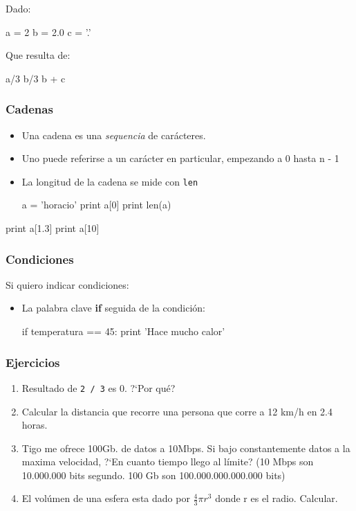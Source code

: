 \begin{frame}[fragile]
    Dado:
    \begin{python}
        a = 2
        b = 2.0
        c = '.'
    \end{python}
    Que resulta de:
    \begin{python}
        a/3
        b/3
        b + c
    \end{python}
\end{frame}

\begin{frame}[fragile]
    \frametitle{Cadenas}
    \begin{itemize}
        \item Una cadena es una \emph{sequencia} de car\'acteres.
        \item Uno puede referirse a un car\'acter en particular, empezando a 0 hasta n - 1
        \item La longitud de la cadena se mide con \texttt{len}
            \begin{python}
                a = 'horacio'
                print a[0]
                print len(a)
            \end{python}
    \end{itemize}
    \begin{python}
        print a[1.3]
        print a[10]
    \end{python}
\end{frame}


\begin{frame}[fragile]
    \frametitle{Condiciones}
    Si quiero indicar condiciones:
    \begin{itemize}
        \item La palabra clave \textbf{if} seguida de la condici\'on:
            \begin{python}
                if temperatura == 45:
                    print 'Hace mucho calor'
            \end{python}
    \end{itemize}
\end{frame}

\begin{frame}
    \frametitle{Ejercicios}
    \begin{enumerate}
        \item Resultado de \texttt{2 / 3} es 0. ?`Por qu\'e?
        \item Calcular la distancia que recorre una persona que corre a 12 km/h en 2.4 horas.
        \item Tigo me ofrece 100Gb. de datos a 10Mbps. Si bajo constantemente datos a la maxima velocidad, 
            ?`En cuanto tiempo llego al l\'imite? (10 Mbps son 10.000.000 bits segundo. 100 Gb son 100.000.000.000.000 bits)
        \item El vol\'umen de una esfera esta dado por $\frac{4}{3}\pi r^3$ donde r es el radio. Calcular.
    \end{enumerate}
\end{frame}

